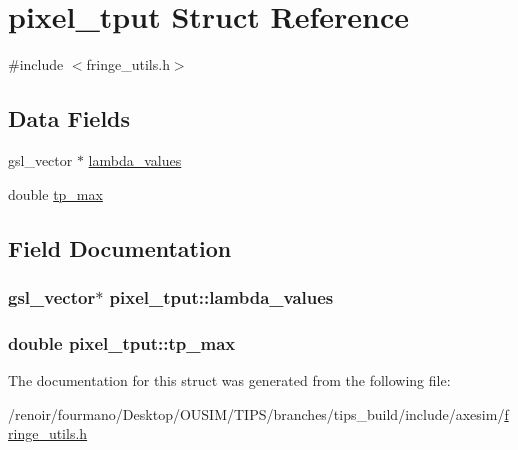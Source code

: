 \hypertarget{structpixel__tput}{
\section{pixel\_\-tput Struct Reference}
\label{structpixel__tput}
}


{\ttfamily \#include $<$fringe\_\-utils.h$>$}\subsection*{Data Fields}
\begin{DoxyCompactItemize}
\item 
gsl\_\-vector $\ast$ \hyperlink{structpixel__tput_a3355adc4f4a25d3490180424541e466a}{lambda\_\-values}
\item 
double \hyperlink{structpixel__tput_a7a54412b8ca33d821512bfaef1420fbc}{tp\_\-max}
\end{DoxyCompactItemize}


\subsection{Field Documentation}
\hypertarget{structpixel__tput_a3355adc4f4a25d3490180424541e466a}{
\subsubsection[{lambda\_\-values}]{\setlength{\rightskip}{0pt plus 5cm}gsl\_\-vector$\ast$ {\bf pixel\_\-tput::lambda\_\-values}}}
\label{structpixel__tput_a3355adc4f4a25d3490180424541e466a}
\hypertarget{structpixel__tput_a7a54412b8ca33d821512bfaef1420fbc}{
\subsubsection[{tp\_\-max}]{\setlength{\rightskip}{0pt plus 5cm}double {\bf pixel\_\-tput::tp\_\-max}}}
\label{structpixel__tput_a7a54412b8ca33d821512bfaef1420fbc}


The documentation for this struct was generated from the following file:\begin{DoxyCompactItemize}
\item 
/renoir/fourmano/Desktop/OUSIM/TIPS/branches/tips\_\-build/include/axesim/\hyperlink{fringe__utils_8h}{fringe\_\-utils.h}\end{DoxyCompactItemize}
